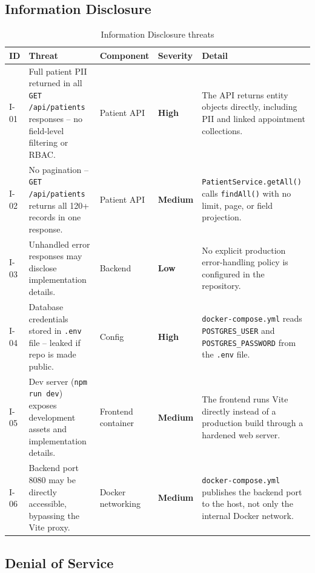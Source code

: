 \documentclass[12pt,a4paper]{report}
\newcommand{\high}{\textbf{\textcolor{sevhigh}{High}}}
\newcommand{\medium}{\textbf{\textcolor{sevmedium}{Medium}}}
\newcommand{\low}{\textbf{\textcolor{sevlow}{Low}}}
\begin{document}
\subsection{Information Disclosure}

\begin{table}[H]
\centering
\caption{Information Disclosure threats}
\begin{tabularx}{\linewidth}{S{1.3cm} S{3.2cm} S{2.4cm} S{2.1cm} X}
\toprule
\textbf{ID} & \textbf{Threat} & \textbf{Component} & \textbf{Severity} & \textbf{Detail} \\
\midrule
I-01 & Full patient PII returned in all \texttt{GET /api/patients} responses -- no field-level filtering or RBAC. & Patient API & \high & The API returns entity objects directly, including PII and linked appointment collections. \\[6pt]
I-02 & No pagination -- \texttt{GET /api/patients} returns all 120+ records in one response. & Patient API & \medium & \texttt{PatientService.getAll()} calls \texttt{findAll()} with no limit, page, or field projection. \\[6pt]
I-03 & Unhandled error responses may disclose implementation details. & Backend & \low & No explicit production error-handling policy is configured in the repository. \\[6pt]
I-04 & Database credentials stored in \texttt{.env} file -- leaked if repo is made public. & Config & \high & \texttt{docker-compose.yml} reads \texttt{POSTGRES\_USER} and \texttt{POSTGRES\_PASSWORD} from the \texttt{.env} file. \\[6pt]
I-05 & Dev server (\texttt{npm run dev}) exposes development assets and implementation details. & Frontend container & \medium & The frontend runs Vite directly instead of a production build through a hardened web server. \\[6pt]
I-06 & Backend port 8080 may be directly accessible, bypassing the Vite proxy. & Docker networking & \medium & \texttt{docker-compose.yml} publishes the backend port to the host, not only the internal Docker network. \\
\bottomrule
\end{tabularx}
\end{table}

\subsection{Denial of Service}
\end{document}
